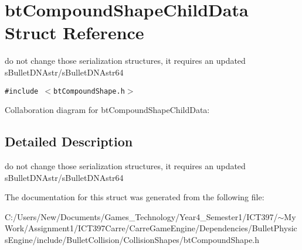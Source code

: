 \hypertarget{structbt_compound_shape_child_data}{
\section{btCompoundShapeChildData Struct Reference}
\label{structbt_compound_shape_child_data}
}
do not change those serialization structures, it requires an updated sBulletDNAstr/sBulletDNAstr64  


{\tt \#include $<$btCompoundShape.h$>$}

Collaboration diagram for btCompoundShapeChildData:

\subsection{Detailed Description}
do not change those serialization structures, it requires an updated sBulletDNAstr/sBulletDNAstr64 

The documentation for this struct was generated from the following file:\begin{CompactItemize}
\item 
C:/Users/New/Documents/Games\_\-Technology/Year4\_\-Semester1/ICT397/$\sim$My Work/Assignment1/ICT397Carre/CarreGameEngine/Dependencies/BulletPhysicsEngine/include/BulletCollision/CollisionShapes/btCompoundShape.h\end{CompactItemize}

